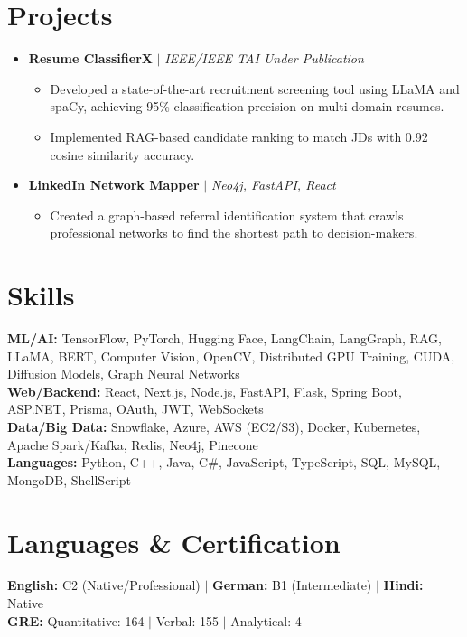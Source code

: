 \documentclass[10pt,a4paper]{article}
\newcommand{\resumeItem}[1]{\item\small{#1}}
\begin{document}
\section{Projects}
\begin{itemize}[label={}]
    \item \textbf{Resume ClassifierX} $|$ \emph{IEEE/IEEE TAI Under Publication}
    \begin{itemize}
        \resumeItem{Developed a state-of-the-art recruitment screening tool using LLaMA and spaCy, achieving 95\% classification precision on multi-domain resumes.}
        \resumeItem{Implemented RAG-based candidate ranking to match JDs with 0.92 cosine similarity accuracy.}
    \end{itemize}

    \item \textbf{LinkedIn Network Mapper} $|$ \emph{Neo4j, FastAPI, React}
    \begin{itemize}
        \resumeItem{Created a graph-based referral identification system that crawls professional networks to find the shortest path to decision-makers.}
    \end{itemize}
    
\end{itemize}

\section{Skills}
\begin{itemize}[label={}]
    \small{\item{
     \textbf{ML/AI:}{ TensorFlow, PyTorch, Hugging Face, LangChain, LangGraph, RAG, LLaMA, BERT, Computer Vision, OpenCV, Distributed GPU Training, CUDA, Diffusion Models, Graph Neural Networks} \\
     \textbf{Web/Backend:}{ React, Next.js, Node.js, FastAPI, Flask, Spring Boot, ASP.NET, Prisma, OAuth, JWT, WebSockets} \\
     \textbf{Data/Big Data:}{ Snowflake, Azure, AWS (EC2/S3), Docker, Kubernetes, Apache Spark/Kafka, Redis, Neo4j, Pinecone} \\
     \textbf{Languages:}{ Python, C++, Java, C\#, JavaScript, TypeScript, SQL, MySQL, MongoDB, ShellScript}
    }}
\end{itemize}

\section{Languages \& Certification}
\begin{itemize}[label={}]
    \small{\item{
     \textbf{English:}{ C2 (Native/Professional)} $|$ \textbf{German:}{ B1 (Intermediate)} $|$ \textbf{Hindi:}{ Native} \\
     \textbf{GRE:}{ Quantitative: 164 $|$ Verbal: 155 $|$ Analytical: 4}
    }}
\end{itemize}
\end{document}
